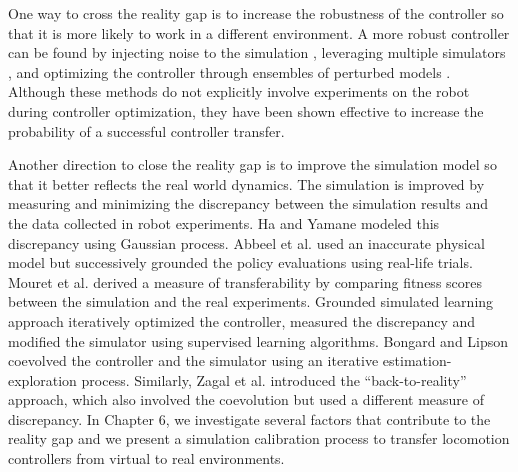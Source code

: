 One way to cross the reality gap is to increase the robustness of the controller so that it is more likely to work in a different environment. A more robust controller can be found by injecting noise to the simulation \cite{Miglino94,Jakobi95,Miglino96}, leveraging multiple simulators \cite{Boeing:2012}, and optimizing the controller through ensembles of perturbed models \cite{Mordatch:2015}. Although these methods do not explicitly involve experiments on the robot during controller optimization, they have been shown effective to increase the probability of a successful controller transfer.

Another direction to close the reality gap is to improve the simulation model so that it better reflects the real world dynamics. The simulation is improved by measuring and minimizing the discrepancy between the simulation results and the data collected in robot experiments. Ha and Yamane \cite{HA:2015} modeled this discrepancy using Gaussian process. Abbeel et al. \cite{Abbeel:2006} used an inaccurate physical model but successively grounded the policy evaluations using real-life trials. Mouret et al. \cite{MouretKD13, Koos:2010} derived a measure of transferability by comparing fitness scores between the simulation and the real experiments. Grounded simulated learning approach \cite{Farchy:2013} iteratively optimized the controller, measured the discrepancy and modified the simulator using supervised learning algorithms. Bongard and Lipson \cite{BongardL05} coevolved the controller and the simulator using an iterative estimation-exploration process. Similarly, Zagal et al. \cite{zagal2004} introduced the ``back-to-reality'' approach, which also involved the coevolution but used a different measure of discrepancy. In Chapter 6, we investigate several factors that contribute to the reality gap and we present a simulation calibration process to transfer locomotion controllers from virtual to real environments.
